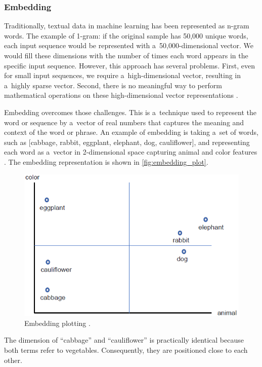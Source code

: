 \subsubsection*{Embedding}
Traditionally, textual data in machine learning has been represented as n-gram words. The example of 1-gram: if the original sample has 50,000 unique words, each input sequence would be represented with a~50,000-dimensional vector. We would fill these dimensions with the number of times each word appears in the specific input sequence. However, this approach has several problems. First, even for small input sequences, we require a~high-dimensional vector, resulting in a~highly sparse vector. Second, there is no meaningful way to perform mathematical operations on these high-dimensional vector representations \cite{timsina2024building}.

Embedding overcomes those challenges. This is a~technique used to represent the word or sequence by a~vector of real numbers that captures the meaning and context of the word or phrase. An example of embedding is taking a~set of words, such as [cabbage, rabbit, eggplant, elephant, dog, cauliflower], and representing each word as a~vector in 2-dimensional space capturing animal and color features \cite{timsina2024building}. The embedding representation is shown in \autoref{fig:embedding_plot}.

\begin{figure}[htbp]
    \centering
    \includegraphics[width=0.7\linewidth]{obrazky-figures/02-theoretical-basis/embedding-vector.png}
    \caption{Embedding plotting \cite{timsina2024building}.}
    \label{fig:embedding_plot}
\end{figure}

The dimension of \enquote{cabbage} and \enquote{cauliflower} is practically identical because both terms refer to vegetables. Consequently, they are positioned close to each other.


